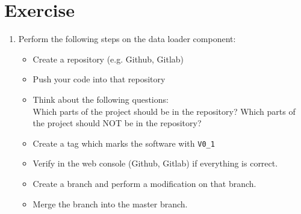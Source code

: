 \section{Exercise}
\begin{enumerate}
\item Perform the following steps on the data loader component:
\begin{itemize}
\item Create a repository (e.g. Github, Gitlab)
\item Push your code into that repository
\item Think about the following questions:\\
Which parts of the project should be in the repository?
Which parts of the project should NOT be in the repository?
\item Create a tag which marks the software with \verb|V0_1|
\item Verify in the web console (Github, Gitlab) if
everything is correct.
\item Create a branch and perform a modification on that branch.
\item Merge the branch into the master branch.
\end{itemize}

\end{enumerate}
\newslide

